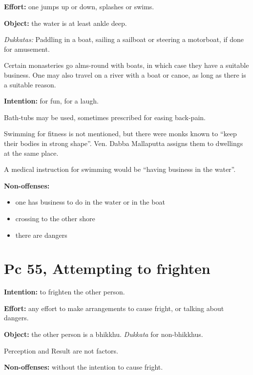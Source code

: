 \begin{multicols}{2}

\textbf{Effort:} one jumps up or down, splashes or swims.

\textbf{Object:} the water is at least ankle deep.

\emph{Dukkatas:} Paddling in a boat, sailing a sailboat or steering a
motorboat, if done for amusement.

Certain monasteries go alms-round with boats, in which case they have a
suitable business. One may also travel on a river with a boat or canoe,
as long as there is a suitable reason.

\textbf{Intention:} for fun, for a laugh.

Bath-tubs may be used, sometimes prescribed for easing back-pain.

Swimming for fitness is not mentioned, but there were monks known to
``keep their bodies in strong shape''. Ven. Dabba Mallaputta assigns
them to dwellings at the same place.

A medical instruction for swimming would be ``having business in the
water''.

\textbf{Non-offenses:}

\begin{itemize}
\tightlist
\item
  one has business to do in the water or in the boat
\item
  crossing to the other shore
\item
  there are dangers
\end{itemize}

\end{multicols}

\section{Pc 55, Attempting to frighten}

\textbf{Intention:} to frighten the other person.

\textbf{Effort:} any effort to make arrangements to cause fright, or
talking about dangers.

\textbf{Object:} the other person is a bhikkhu. \emph{Dukkata} for
non-bhikkhus.

Perception and Result are not factors.

\textbf{Non-offenses:} without the intention to cause fright.

